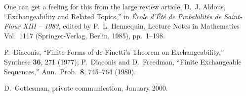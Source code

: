 \begin{thebibliography}{10}
One can get a feeling for this from the large review article, D.~J.
Aldous, ``Exchangeability and Related Topics,'' in {\sl \'Ecole
d'\'Et\'e de Probabilit\'es de Saint-Flour XIII -- 1983}, edited by
P.~L. Hennequin, Lecture Notes in Mathematics Vol.\ 1117
(Springer-Verlag, Berlin, 1985), pp.~1--198.

P.~Diaconis, ``Finite Forms of de Finetti's Theorem on
Exchangeability,'' Synthese {\bf 36}, 271 (1977); P.~Diaconis and
D.~Freedman, ``Finite Exchangeable Sequences,'' Ann.\ Prob.\ {\bf 8},
745--764 (1980).

D.~Gottesman, private communication, January 2000.

\end{thebibliography}


